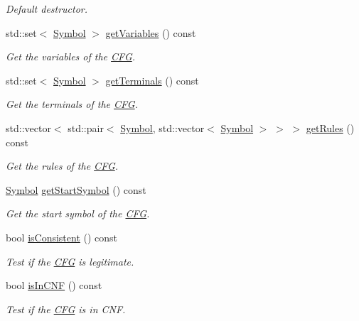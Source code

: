 \begin{DoxyCompactItemize}
\begin{DoxyCompactList}\small\item\em \-Default destructor. \end{DoxyCompactList}\item 
std\-::set$<$ \hyperlink{class_symbol}{\-Symbol} $>$ \hyperlink{class_c_f_g_a6f9ff5f8424c172ad7b7bd27722f2769}{get\-Variables} () const 
\begin{DoxyCompactList}\small\item\em \-Get the variables of the \hyperlink{class_c_f_g}{\-C\-F\-G}. \end{DoxyCompactList}\item 
std\-::set$<$ \hyperlink{class_symbol}{\-Symbol} $>$ \hyperlink{class_c_f_g_a2796f5730364b7337bb40180713d0ea4}{get\-Terminals} () const 
\begin{DoxyCompactList}\small\item\em \-Get the terminals of the \hyperlink{class_c_f_g}{\-C\-F\-G}. \end{DoxyCompactList}\item 
std\-::vector$<$ std\-::pair$<$ \hyperlink{class_symbol}{\-Symbol}, \*
std\-::vector$<$ \hyperlink{class_symbol}{\-Symbol} $>$ $>$ $>$ \hyperlink{class_c_f_g_adb1c77c1901d8ed60a275b32d33f45a1}{get\-Rules} () const 
\begin{DoxyCompactList}\small\item\em \-Get the rules of the \hyperlink{class_c_f_g}{\-C\-F\-G}. \end{DoxyCompactList}\item 
\hyperlink{class_symbol}{\-Symbol} \hyperlink{class_c_f_g_a589b27d27aecf99c10a5b1de5f1ec16b}{get\-Start\-Symbol} () const 
\begin{DoxyCompactList}\small\item\em \-Get the start symbol of the \hyperlink{class_c_f_g}{\-C\-F\-G}. \end{DoxyCompactList}\item 
bool \hyperlink{class_c_f_g_aea6e13f225aaa4149fffacd9e74d0a16}{is\-Consistent} () const 
\begin{DoxyCompactList}\small\item\em \-Test if the \hyperlink{class_c_f_g}{\-C\-F\-G} is legitimate. \end{DoxyCompactList}\item 
bool \hyperlink{class_c_f_g_a8d83c48ca1e83ed8d51823ebcd9a147e}{is\-In\-C\-N\-F} () const 
\begin{DoxyCompactList}\small\item\em \-Test if the \hyperlink{class_c_f_g}{\-C\-F\-G} is in \-C\-N\-F. \end{DoxyCompactList}\item 

\end{DoxyCompactItemize}
